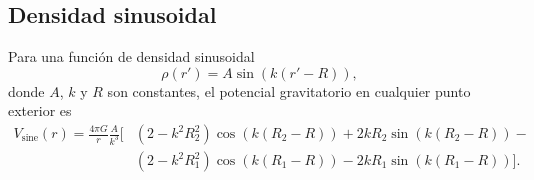 \begin{subappendices}
\subsection{Densidad sinusoidal}

Para una función de densidad sinusoidal
%
\begin{equation}
    \rho(r') = A \sin ( k (r' - R)),
\end{equation}
%
donde $A$, $k$ y $R$ son constantes, el potencial gravitatorio en
cualquier punto exterior es
%
\begin{equation}
    \begin{split}
        V_\text{sine}(r) = \frac{4\pi G}{r} \frac{A}{k^3} \Big[
    & (2 - k^2 R_2^2) \cos(k(R_2 - R)) + 2 k R_2 \sin(k(R_2 - R)) - \\
    & (2 - k^2 R_1^2) \cos(k(R_1 - R)) - 2 k R_1 \sin(k(R_1 - R))
    \Big].
    \end{split}
\end{equation}

\end{subappendices}
